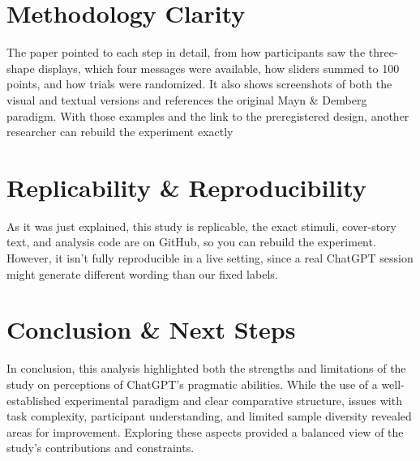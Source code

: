 \documentclass[12pt]{article}
\begin{document}
\section{Methodology Clarity}
The paper pointed to each step in detail, from how participants saw the three-shape displays, which four messages were available, how sliders summed to 100 points, and how trials were randomized. It also shows screenshots of both the visual and textual versions and references the original Mayn \& Demberg paradigm. With those examples and the link to the preregistered design, another researcher can rebuild the experiment exactly

\section{Replicability \& Reproducibility}
As it was just explained, this study is replicable, the exact stimuli, cover-story text, and analysis code are on GitHub, so you can rebuild the experiment. However, it isn’t fully reproducible in a live setting, since a real ChatGPT session might generate different wording than our fixed labels.


\section{Conclusion \& Next Steps}
In conclusion, this analysis highlighted both the strengths and limitations of the study on perceptions of ChatGPT’s pragmatic abilities. While the use of a well-established experimental paradigm and clear comparative structure, issues with task complexity, participant understanding, and limited sample diversity revealed areas for improvement. Exploring these aspects provided a balanced view of the study’s contributions and constraints.

 

\end{document}
